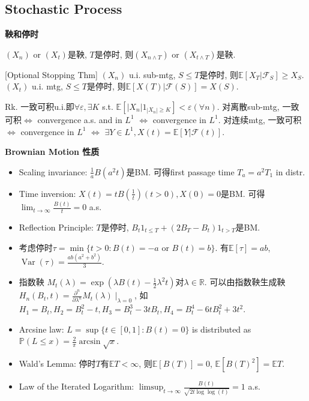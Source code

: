 \documentclass[UTF8]{ctexart}
\begin{document}
\subsection{Stochastic Process}

\noindent \textbf{鞅和停时}

$(X_n)$ or $(X_t)$是鞅, $T$是停时, 则$(X_{n\wedge T})$ or $(X_{t\wedge T})$是鞅.

[Optional Stopping Thm] $(X_n)$ u.i. sub-mtg, $S\leq T$是停时, 则$\mathbb{E}[X_T|\mathcal{F}_S]\geq X_S$.
$(X_t)$ u.i. mtg, $S\leq T$是停时, 则$\mathbb{E}[X(T)|\mathcal{F}(S)]=X(S)$.

Rk. 一致可积u.i.即$\forall \varepsilon, \exists K$ s.t. $\mathbb{E}[|X_n|1_{|X_n|\geq K}]<\varepsilon (\forall n)$.
对离散sub-mtg, 一致可积$\Leftrightarrow$ convergence a.s. and in $L^1$  $\Leftrightarrow$ convergence in $L^1$.
对连续mtg, 一致可积$\Leftrightarrow$ convergence in $L^1$  $\Leftrightarrow$ $\exists Y\in L^1, X(t)=\mathbb{E}[Y|\mathcal{F}(t)]$.


\noindent \textbf{Brownian Motion 性质} \par
\begin{itemize}
\item Scaling invariance: $\frac{1}{a} B(a^2t)$是BM. 可得first passage time $T_a=a^2 T_1$ in distr.

\item Time inversion: $X(t)=tB(\frac{1}{t})(t>0),X(0)=0$是BM. 可得 $\lim_{t\to\infty}\frac{B(t)}{t}=0$ a.s.

\item Reflection Principle: $T$是停时, $B_t1_{t\leq T}+(2B_T-B_t)1_{t>T}$是BM.

\item 考虑停时$\tau = \min\{t>0: B(t)=-a \text{ or } B(t)=b\}$. 有$\mathbb{E}[\tau]=ab$, 
	$\operatorname{Var}(\tau)=\frac{ab(a^2+b^2)}{3}$.

\item 指数鞅 $M_t(\lambda)=\exp(\lambda B(t)-\frac12 \lambda^2 t)$对$\lambda\in\mathbb{R}$. 
	可以由指数鞅生成鞅 $H_n(B_t,t)=\frac{\partial^n}{\partial\lambda^n}M_t(\lambda)\mid_{\lambda=0}$,
	如$H_1=B_t, H_2=B_t^2-t, H_3=B_t^3-3tB_t, H_4=B_t^4-6tB_t^2+3t^2$.

\item Arcsine law: $L=\sup \{t\in[0,1]:B(t)=0\}$ is distributed as $\mathbb{P}(L\leq x)=\frac{2}{\pi}\arcsin\sqrt{x}$.

\item Wald's Lemma: 停时$T$有$\mathbb{E}T <\infty$, 则$\mathbb{E}[B(T)]=0$, $\mathbb{E}[B(T)^2]=\mathbb{E}T$.

\item Law of the Iterated Logarithm: $\limsup _{t \rightarrow \infty} \frac{B(t)}{\sqrt{2 t \log \log (t)}}=1$ a.s.

\end{itemize}
\end{document}
